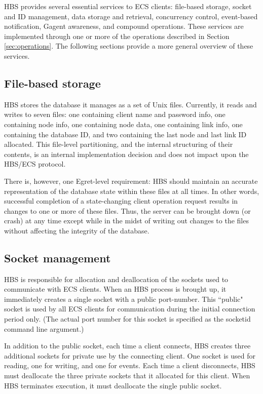 HBS provides several essential services to ECS clients: file-based storage,
socket and ID management, data storage and retrieval, concurrency control,
event-based notification, Gagent awareness, and compound operations.  These
services are implemented through one or more of the operations described in
Section \ref{sec:operations}. The following sections provide a more general
overview of these services.

\subsection {File-based storage}

HBS stores the database it manages as a set of Unix files. Currently, it
reads and writes to seven files: one containing client name
and password info, one containing node info, one containing
node data, one containing link info, one containing the database ID, and
two containing the last node and last link ID allocated.  This file-level
partitioning, and the internal structuring of their contents, is an
internal implementation decision and does not impact upon the HBS/ECS
protocol.

There is, however, one Egret-level requirement: HBS should maintain an
accurate representation of the database state within these files at all
times.  In other words, successful completion of a state-changing client
operation request results in changes to one or more of these files.  Thus,
the server can be brought down (or crash) at any time except while in the
midst of writing out changes to the files without affecting the integrity
of the database.

\subsection {Socket management}  

HBS is responsible for allocation and deallocation of the sockets used to
communicate with ECS clients.  When an HBS process is brought up, it
immediately creates a single socket with a public port-number.  This
``public" socket is used by all ECS clients for communication during the
initial connection period only. (The actual port number for this socket is
specified as the socketid command line argument.)
  
In addition to the public socket, each time a client connects, HBS
creates three additional sockets for private use by the connecting
client.  One socket is used for reading, one for writing, and one for
events.  Each time a client disconnects, HBS must deallocate the three
private sockets that it allocated for this client. When HBS terminates
execution, it must deallocate the single public socket.


